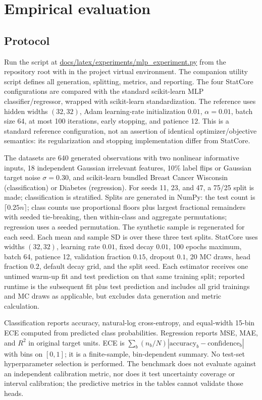 \documentclass[conference]{IEEEtran}
\begin{document}
\section{Empirical evaluation}
\subsection{Protocol}
Run the script at \url{docs/latex/experiments/mlp_experiment.py} from the repository root with  in the project virtual environment. The companion utility script defines all generation, splitting, metrics, and reporting. The four StatCore configurations are compared with the standard scikit-learn MLP classifier/regressor, wrapped with scikit-learn standardization. The reference uses hidden widths $(32,32)$, Adam learning-rate initialization $0.01$, $\alpha=0.01$, batch size 64, at most 100 iterations, early stopping, and patience 12. This is a standard reference configuration, not an assertion of identical optimizer/objective semantics: its regularization and stopping implementation differ from StatCore.

The datasets are 640 generated observations with two nonlinear informative inputs, 18 independent Gaussian irrelevant features, 10\% label flips or Gaussian target noise $\sigma=0.30$, and scikit-learn bundled Breast Cancer Wisconsin (classification) or Diabetes (regression). For seeds 11, 23, and 47, a 75/25 split is made; classification is stratified. Splits are generated in NumPy: the test count is $\lceil0.25n\rceil$; class counts use proportional floors plus largest fractional remainders with seeded tie-breaking, then within-class and aggregate permutations; regression uses a seeded permutation. The synthetic sample is regenerated for each seed. Each mean and sample SD is over these three test splits. StatCore uses widths $(32,32)$, learning rate $0.01$, fixed decay $0.01$, 100 epochs maximum, batch 64, patience 12, validation fraction $0.15$, dropout $0.1$, 20 MC draws, head fraction $0.2$, default decay grid, and the split seed. Each estimator receives one untimed warm-up fit and test prediction on that same training split; reported runtime is the subsequent fit plus test prediction and includes all grid trainings and MC draws as applicable, but excludes data generation and metric calculation.

Classification reports accuracy, natural-log cross-entropy, and equal-width 15-bin ECE computed from predicted class probabilities. Regression reports MSE, MAE, and $R^2$ in original target units. ECE is $\sum_b(n_b/N)|\mathrm{accuracy}_b-\mathrm{confidence}_b|$ with bins on $[0,1]$; it is a finite-sample, bin-dependent summary. No test-set hyperparameter selection is performed. The benchmark does not evaluate  against an independent calibration metric, nor does it test uncertainty coverage or interval calibration; the predictive metrics in the tables cannot validate those heads.
\end{document}
